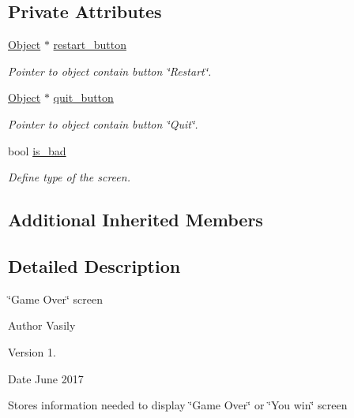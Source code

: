 \subsection*{Private Attributes}
\begin{DoxyCompactItemize}
\item 
\mbox{\label{class_game_over_a5d017200c062c83022d9efe2c29e0633}} 
\hyperlink{class_object}{Object} $\ast$ \hyperlink{class_game_over_a5d017200c062c83022d9efe2c29e0633}{restart\+\_\+button}
\begin{DoxyCompactList}\small\item\em Pointer to object contain button \char`\"{}\+Restart\char`\"{}. \end{DoxyCompactList}\item 
\mbox{\label{class_game_over_a60a67578fd38fa4f4b464f69edc7ef9b}} 
\hyperlink{class_object}{Object} $\ast$ \hyperlink{class_game_over_a60a67578fd38fa4f4b464f69edc7ef9b}{quit\+\_\+button}
\begin{DoxyCompactList}\small\item\em Pointer to object contain button \char`\"{}\+Quit\char`\"{}. \end{DoxyCompactList}\item 
bool \hyperlink{class_game_over_a4a7103cf4db129cad83b0c001c32d116}{is\+\_\+bad}
\begin{DoxyCompactList}\small\item\em Define type of the screen. \end{DoxyCompactList}\end{DoxyCompactItemize}
\subsection*{Additional Inherited Members}


\subsection{Detailed Description}
\char`\"{}\+Game Over\char`\"{} screen 

\begin{DoxyAuthor}{Author}
Vasily 
\end{DoxyAuthor}
\begin{DoxyVersion}{Version}
1. 
\end{DoxyVersion}
\begin{DoxyDate}{Date}
June 2017
\end{DoxyDate}
Stores information needed to display \char`\"{}\+Game Over\char`\"{} or \char`\"{}\+You win\char`\"{} screen 

